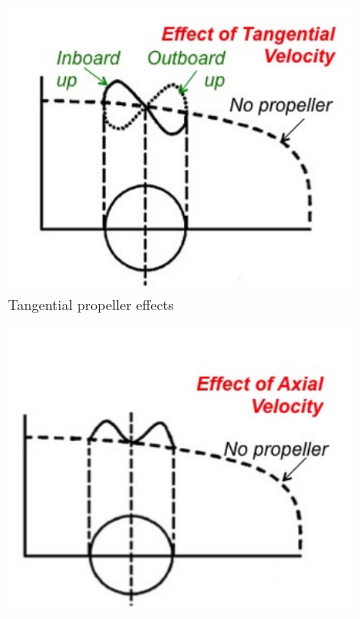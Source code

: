 \begin{figure}[H]
     \centering
     \begin{subfigure}[b]{0.28\textwidth}
         \centering
         \includegraphics[width=\textwidth]{03_LiteratureReview/Figs/tanget.png}
         \caption{Tangential propeller effects}
         \label{fig:2a}
     \end{subfigure}
\hfill
     \begin{subfigure}[b]{0.28\textwidth}
         \centering
         \includegraphics[width=\textwidth]{03_LiteratureReview/Figs/axial.png}

\end{subfigure}
\end{figure}
